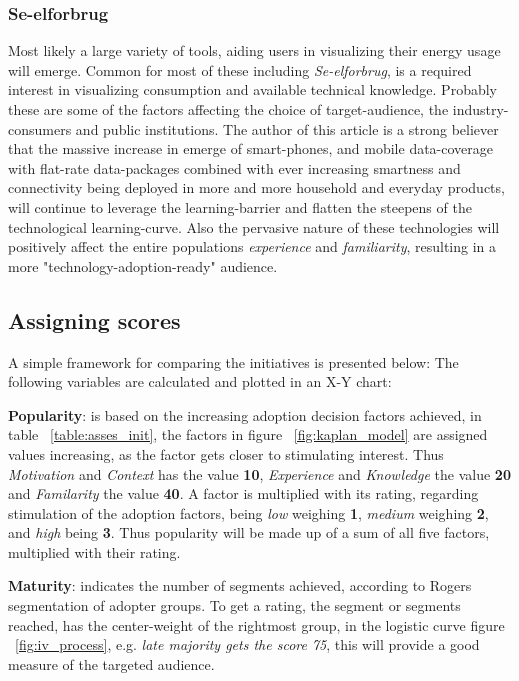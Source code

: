 \documentclass[journal]{IEEEtran}
\begin{document}
\subsubsection{Se-elforbrug}
Most likely a large variety of tools, aiding users in visualizing their energy usage will emerge. Common for most of these including \textit{Se-elforbrug}, is a required interest in visualizing consumption and available technical knowledge. Probably these are some of the factors affecting the choice of target-audience, the industry-consumers and public institutions.
The author of this article is a strong believer that the massive increase in emerge of smart-phones, and mobile data-coverage with flat-rate data-packages combined with ever increasing smartness and connectivity being deployed in more and more household and everyday products, will continue to leverage the learning-barrier and flatten the steepens of the technological learning-curve. Also the pervasive nature of these technologies will positively affect the entire populations \textit{experience} and \textit{familiarity}, resulting in a more "technology-adoption-ready" audience.

\subsection{Assigning scores}
A simple framework for comparing the initiatives is presented below:
The following variables are calculated and plotted in an X-Y chart: \newline

\textbf{Popularity}: is based on the increasing adoption decision factors achieved, in table ~\ref{table:asses_init}, the factors in figure ~\ref{fig:kaplan_model} are assigned values increasing, as the factor gets closer to stimulating interest.
Thus \textit{Motivation} and \textit{Context} has the value \textbf{10}, \textit{Experience} and \textit{Knowledge} the value \textbf{20} and \textit{Familarity} the value \textbf{40}. A factor is multiplied with its rating, regarding stimulation of the adoption factors, being \textit{low} weighing \textbf{1}, \textit{medium} weighing \textbf{2}, and \textit{high} being \textbf{3}.
Thus popularity will be made up of a sum of all five factors, multiplied with their rating.\newline

\textbf{Maturity}: indicates the number of segments achieved, according to Rogers segmentation of adopter groups. 
To get a rating, the segment or segments reached, has the center-weight of the rightmost group, in the logistic curve figure ~\ref{fig:iv_process}, e.g. \textit{late majority gets the score 75}, this will provide a good measure of the targeted audience.\newline
\end{document}
